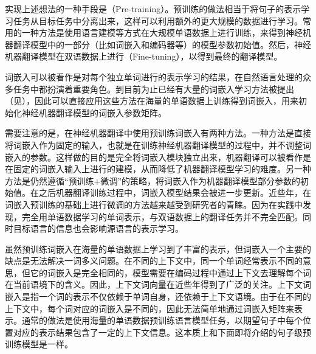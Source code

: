 \parinterval 实现上述想法的一种手段是{\small\sffamily{}}（Pre-training）。预训练的做法相当于将句子的表示学习任务从目标任务中分离出来，这样可以利用额外的更大规模的数据进行学习。常用的一种方法是使用语言建模等方式在大规模单语数据上进行训练，来得到神经机器翻译模型中的一部分（比如词嵌入和编码器等）的模型参数初始值。然后，神经机器翻译模型在双语数据上进行{\small\sffamily{}}（Fine-tuning），以得到最终的翻译模型。

\parinterval 词嵌入可以被看作是对每个独立单词进行的表示学习的结果，在自然语言处理的众多任务中都扮演着重要角色。到目前为止已经有大量的词嵌入学习方法被提出（见{\chapternine}），因此可以直接应用这些方法在海量的单语数据上训练得到词嵌入，用来初始化神经机器翻译模型的词嵌入参数矩阵。

\parinterval 需要注意的是，在神经机器翻译中使用预训练词嵌入有两种方法。一种方法是直接将词嵌入作为固定的输入，也就是在训练神经机器翻译模型的过程中，并不调整词嵌入的参数。这样做的目的是完全将词嵌入模块独立出来，机器翻译可以被看作是在固定的词嵌入输入上进行的建模，从而降低了机器翻译模型学习的难度。另一种方法是仍然遵循``预训练+微调''的策略，将词嵌入作为机器翻译模型部分参数的初始值。在之后机器翻译训练过程中，词嵌入模型结果会被进一步更新。近些年，在词嵌入预训练的基础上进行微调的方法越来越受到研究者的青睐。因为在实践中发现，完全用单语数据学习的单词表示，与双语数据上的翻译任务并不完全匹配。同时目标语言的信息也会影响源语言的表示学习。

\parinterval 虽然预训练词嵌入在海量的单语数据上学习到了丰富的表示，但词嵌入一个主要的缺点是无法解决一词多义问题。在不同的上下文中，同一个单词经常表示不同的意思，但它的词嵌入是完全相同的，模型需要在编码过程中通过上下文去理解每个词在当前语境下的含义。因此，上下文词向量在近些年得到了广泛的关注。上下文词嵌入是指一个词的表示不仅依赖于单词自身，还依赖于上下文语境。由于在不同的上下文中，每个词对应的词嵌入是不同的，因此无法简单地通过词嵌入矩阵来表示。通常的做法是使用海量的单语数据预训练语言模型任务，以期望句子中每个位置对应的表示结果包含了一定的上下文信息。这本质上和下面即将介绍的句子级预训练模型是一样。

